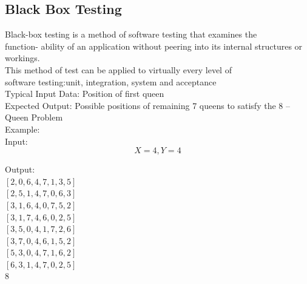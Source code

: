 \documentclass[a4paper,12pt]{article}
\begin{document}
	\subsection{Black Box Testing}
	Black-box testing is a method of software testing that examines the\\ function- ability of an application without peering into its internal structures or workings.\\
	This method of test can be applied to virtually every level of\\ software testing:unit, integration, system and acceptance\\
	Typical Input Data:  Position of first queen\\
	Expected Output: Possible positions of remaining 7 queens to satisfy the 8 – Queen Problem\\
	
	\noindent Example:\\
	Input: \\
	$$X = 4 , Y = 4$$
	
	Output:\\
	$[2, 0, 6, 4, 7, 1, 3, 5]$\\
	$[2, 5, 1, 4, 7, 0, 6, 3]$\\
	$[3, 1, 6, 4, 0, 7, 5, 2]$\\
	$[3, 1, 7, 4, 6, 0, 2, 5]$\\
	$[3, 5, 0, 4, 1, 7, 2, 6]$\\
	$[3, 7, 0, 4, 6, 1, 5, 2]$\\
	$[5, 3, 0, 4, 7, 1, 6, 2]$\\
	$[6, 3, 1, 4, 7, 0, 2, 5]$\\
	8\\
	
\end{document}
